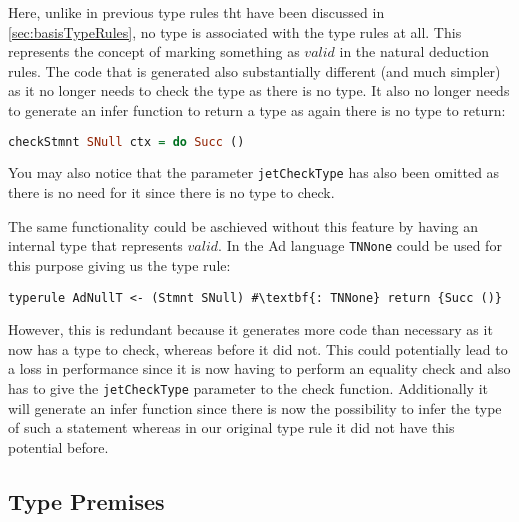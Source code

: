 Here, unlike in previous type rules tht have been discussed in \autoref{sec:basisTypeRules}, no type is associated with the type rules at all.
This represents the concept of marking something as $valid$ in the natural deduction rules.
The code that is generated also substantially different (and much simpler) as it no longer needs to check the type as there is no type.
It also no longer needs to generate an infer function to return a type as again there is no type to return:
\begin{lstlisting}[language=Haskell, numbers=none]
checkStmnt SNull ctx = do Succ ()
\end{lstlisting}
You may also notice that the parameter \texttt{jetCheckType} has also been omitted as there is no need for it since there is no type to check.

The same functionality could be aschieved without this feature by having an internal type that represents $valid$.
In the Ad language \texttt{TNNone} could be used for this purpose giving us the type rule:
\begin{lstlisting}[escapechar=\#, numbers=none]
typerule AdNullT <- (Stmnt SNull) #\textbf{: TNNone} return {Succ ()}
\end{lstlisting}
However, this is redundant because it generates more code than necessary as it now has a type to check, whereas before it did not.
This could potentially lead to a loss in performance since it is now having to perform an equality check and also has to give the \texttt{jetCheckType} parameter to the check function.
Additionally it will generate an infer function since there is now the possibility to infer the type of such a statement whereas in our original type rule it did not have this potential before.

\subsection{Type Premises}
\label{sec:premiseTypeRules}

